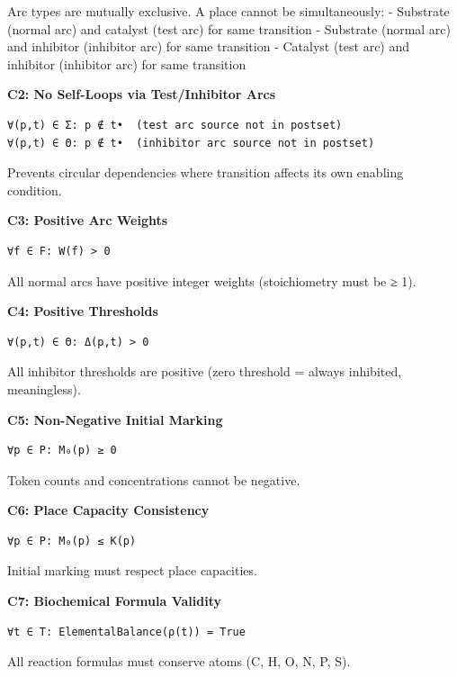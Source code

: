 Arc types are mutually exclusive. A place cannot be simultaneously: -
Substrate (normal arc) and catalyst (test arc) for same transition -
Substrate (normal arc) and inhibitor (inhibitor arc) for same transition
- Catalyst (test arc) and inhibitor (inhibitor arc) for same transition

\textbf{C2: No Self-Loops via Test/Inhibitor Arcs}

\begin{lstlisting}
∀(p,t) ∈ Σ: p ∉ t•  (test arc source not in postset)
∀(p,t) ∈ Θ: p ∉ t•  (inhibitor arc source not in postset)
\end{lstlisting}

Prevents circular dependencies where transition affects its own enabling
condition.

\textbf{C3: Positive Arc Weights}

\begin{lstlisting}
∀f ∈ F: W(f) > 0
\end{lstlisting}

All normal arcs have positive integer weights (stoichiometry must be ≥
1).

\textbf{C4: Positive Thresholds}

\begin{lstlisting}
∀(p,t) ∈ Θ: Δ(p,t) > 0
\end{lstlisting}

All inhibitor thresholds are positive (zero threshold = always
inhibited, meaningless).

\textbf{C5: Non-Negative Initial Marking}

\begin{lstlisting}
∀p ∈ P: M₀(p) ≥ 0
\end{lstlisting}

Token counts and concentrations cannot be negative.

\textbf{C6: Place Capacity Consistency}

\begin{lstlisting}
∀p ∈ P: M₀(p) ≤ K(p)
\end{lstlisting}

Initial marking must respect place capacities.

\textbf{C7: Biochemical Formula Validity}

\begin{lstlisting}
∀t ∈ T: ElementalBalance(ρ(t)) = True
\end{lstlisting}

All reaction formulas must conserve atoms (C, H, O, N, P, S).

